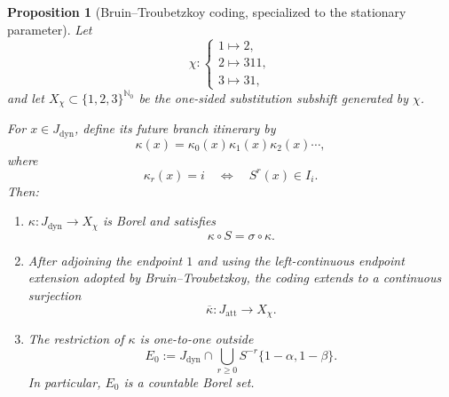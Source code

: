 \documentclass[11pt]{amsart}
\theoremstyle{plain}
\newtheorem{proposition}[theorem]{Proposition}
\theoremstyle{definition}
\theoremstyle{remark}
\begin{document}
\begin{proposition}[Bruin--Troubetzkoy coding, specialized to the stationary parameter]
\label{lem:BT-symbolic-coding}
Let
\[
        \chi:
        \begin{cases}
        1\mapsto2,\\
        2\mapsto311,\\
        3\mapsto31,
        \end{cases}
\]
and let \(X_\chi\subset\{1,2,3\}^{\mathbb N_0}\) be the one-sided
substitution subshift generated by \(\chi\).

For \(x\in J_{\mathrm{dyn}}\), define its future branch itinerary by
\[
        \kappa(x)
        =
        \kappa_0(x)\kappa_1(x)\kappa_2(x)\cdots,
\]
where
\[
        \kappa_r(x)=i
        \quad\Longleftrightarrow\quad
        S^r(x)\in I_i.
\]
Then:

\begin{enumerate}[label=\textup{(\roman*)}]
\item
\(\kappa:J_{\mathrm{dyn}}\to X_\chi\) is Borel and satisfies
\[
        \kappa\circ S=\sigma\circ\kappa.
\]

\item
After adjoining the endpoint \(1\) and using the left-continuous endpoint
extension adopted by Bruin--Troubetzkoy, the coding extends to a continuous
surjection
\[
        \overline\kappa:J_{\mathrm{att}}\longrightarrow X_\chi.
\]

\item
The restriction of \(\kappa\) is one-to-one outside
\[
        E_0
        :=
        J_{\mathrm{dyn}}
        \cap
        \bigcup_{r\geq0}
        S^{-r}\{1-\alpha,1-\beta\}.
\]
In particular, \(E_0\) is a countable Borel set.
\end{enumerate}
\end{proposition}
\end{document}
